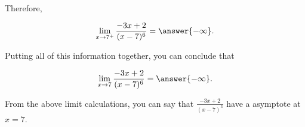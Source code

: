 \documentclass[handout]{ximera}
\begin{document}
\begin{exercise}
\begin{itemize}
\end{itemize}

Therefore, 

 \[ \displaystyle\lim_{x \to 7^+} \frac{-3x+2}{(x-7)^6} = \answer{-\infty}. \]

Putting all of this information together, you can conclude that

\[ \displaystyle\lim_{x \to 7} \frac{-3x+2}{(x-7)^6} = \answer{-\infty}. \]

\begin{exercise}

From the above limit calculations, you can say that $\frac{-3x+2}{(x-7)^3}$  have a  asymptote at $x =7$. 

\end{exercise}

\end{exercise}
\end{document}
